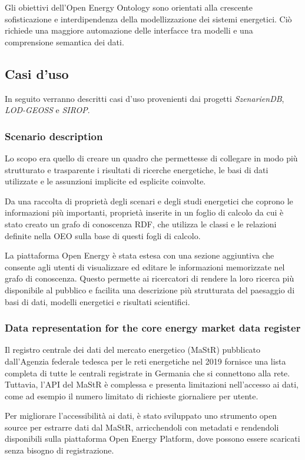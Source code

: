 Gli obiettivi dell'Open Energy Ontology \cite{OEO} sono orientati alla
crescente
sofisticazione e interdipendenza della modellizzazione dei sistemi energetici.
Ciò richiede una maggiore automazione delle interfacce tra modelli e una
comprensione semantica dei dati.

\subsection{Casi d'uso}
In seguito verranno descritti casi d'uso provenienti dai progetti
\textit{SzenarienDB}, \textit{LOD-GEOSS} e \textit{SIROP}.

\subsubsection{Scenario description}
Lo scopo era quello di creare un quadro che permettesse di collegare in modo
più strutturato e trasparente i risultati di ricerche energetiche, le basi di
dati utilizzate e le assunzioni implicite ed esplicite coinvolte.

Da una raccolta di proprietà degli scenari e degli
studi energetici che coprono le informazioni più importanti, proprietà inserite
in un foglio di calcolo da cui è stato creato un
grafo di conoscenza RDF, che utilizza
le classi e le relazioni definite nella OEO sulla base di questi fogli di
calcolo.

La piattaforma Open Energy è stata estesa con una sezione aggiuntiva che
consente agli utenti
di visualizzare ed editare le informazioni memorizzate nel grafo di conoscenza.
Questo permette ai ricercatori di rendere la loro ricerca più disponibile al
pubblico e facilita una descrizione più strutturata del paesaggio di basi di
dati, modelli energetici e risultati scientifici.

\subsubsection{Data representation for the core energy market data register}
Il registro centrale dei dati del mercato energetico (MaStR) pubblicato
dall'Agenzia federale tedesca per le reti energetiche nel 2019 fornisce una
lista completa di tutte le centrali registrate in Germania che si connettono
alla rete. Tuttavia, l'API del MaStR è complessa e presenta limitazioni
nell'accesso ai dati, come ad esempio il numero limitato di richieste
giornaliere per utente.

Per migliorare l'accessibilità ai dati, è stato
sviluppato uno strumento open source per estrarre dati dal MaStR, arricchendoli
con metadati e rendendoli disponibili sulla piattaforma Open Energy Platform,
dove possono essere scaricati senza bisogno di registrazione.

